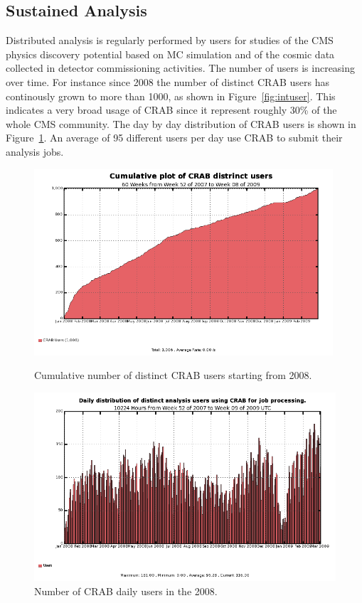 \subsection{Sustained Analysis}
\label{sec:5_2}

Distributed analysis is regularly performed by users for studies of the CMS physics discovery potential based on MC simulation and of the cosmic data collected in detector commissioning activities.
The number of users is increasing over time. For instance since 2008 the number of distinct CRAB users has continously grown to more than 1000, as shown in Figure~\ref{fig:intuser}. This indicates a very broad usage of CRAB since it represent roughly 30\% of the whole CMS community.
The day by day distribution of CRAB users is shown in Figure~\ref{fig:distusers}. An average of 95 different users per day use CRAB to submit their analysis 
jobs. 

\begin{figure}
\begin{minipage}{.48\textwidth}
\centering
\includegraphics[width=0.99\textwidth]{figures/UserInteg.png}
\caption{Cumulative number of distinct CRAB users starting from 2008. }
\label{fig:intuser}
\end{minipage}
\begin{minipage}{.48\textwidth}
\centering
\includegraphics[width=1.2\textwidth]{figures/crabusersdaily.png}
\caption{Number of CRAB daily users in the 2008. }
\label{fig:distusers}
\end{minipage}
\end{figure}


